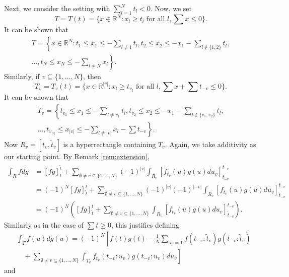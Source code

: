 \documentclass[english, a4paper, 12pt,reqno]{amsart}
\begin{document}
Next, we consider the setting with $\sum_{l=1}^N t_l  <0$. Now, we set
\begin{equation}
\label{T2}
T = T(t)= \{x\in\mathbb{R}^N : x_l \geq t_l\text{ for all } l, \sum x \leq 0\}.
\end{equation}
It can be shown that
\begin{equation*}
\begin{split}
T = \left\{x\in\mathbb{R}^N :  t_1 \leq x_1 \leq-\sum_{l\neq 1}t_l, t_2 \leq x_2 \leq-x_1-\sum_{l \notin \{1,2\}} t_l,\right.\\
\left.\dots, t_N \leq x_N \leq  -\sum_{l\neq N}x_l  \right\}.
\end{split}
\end{equation*}
Similarly, if $v \subseteq \{1,\dots,N\}$, then
$$T_v =T_v(t)= \{ x\in\mathbb{R}^{|v|} : x_l \geq t_{v_l} \text{ for all } l, \sum x+ \sum t_{-v} \leq 0\}.$$
It can be shown that
\begin{equation}
\begin{split}
\label{Tv2}
T_v = \left\{ t_{v_1}\leq x_1 \leq -\sum_{l\neq v_1} t_l,  t_{v_2} \leq x_2 \leq -x_1-\sum_{l \notin \{v_1,v_2\}} t_l,\right.\\
\left. \dots,  t_{v_{|v|}} \leq x_{|v|}\leq  -\sum_{l\neq |v|}x_l  - \sum t_{-v} \right\}.
\end{split}
\end{equation}
Now $R_v = [t_v,\tilde{t}_v]$ is a hyperrectangle containing $T_v$. Again, we take additivity as our starting point. By Remark \ref{rem:extension},
\begin{equation*}
\begin{split}
\int_R f dg  &= [fg]_t^{\tilde{t}} + \sum_{\emptyset \neq v \subseteq \{1,\dots, N\}} (-1)^{|v|} \int_{R_v} [f_{t_v}(u) g(u) du_v]_{t_{-v}}^{\tilde{t}_{-v}}\\
&= (-1)^N[fg]_{\tilde{t}}^t + \sum_{\emptyset \neq v \subseteq \{1,\dots, N\}} (-1)^{|v|} (-1)^{|-v|}\int_{R_v} [f_{t_v}(u) g(u) du_v]_{\tilde{t}_{-v}}^{t_{-v}}\\
&= (-1)^N\left([fg]_{\tilde{t}}^t + \sum_{\emptyset \neq v \subseteq \{1,\dots, N\}} \int_{R_v} [f_{t_v}(u) g(u) du_v]_{\tilde{t}_{-v}}^{t_{-v}} \right).
\end{split}
\end{equation*}
Similarly as in the case of $\sum t \geq 0$, this justifies defining 
\begin{equation}
\label{superintegral2}
\begin{split}
&\int_T f(u) dg(u)  = (-1)^N \left[f(t) g(t)  - \frac{1}{N} \sum_{|v| = 1} f(t_{-v} :\tilde{t}_v) g(t_{-v} :\tilde{t}_v)  \right.\\
&\quad + \left.
\sum_{\emptyset\neq v \subseteq \{1,\dots,N\}}\int_{T_v} {f}_{t_v}({t_{-v}:u_v}) g(t_{-v}:u_v) du_v\right]
\end{split}
\end{equation}
and
\end{document}
